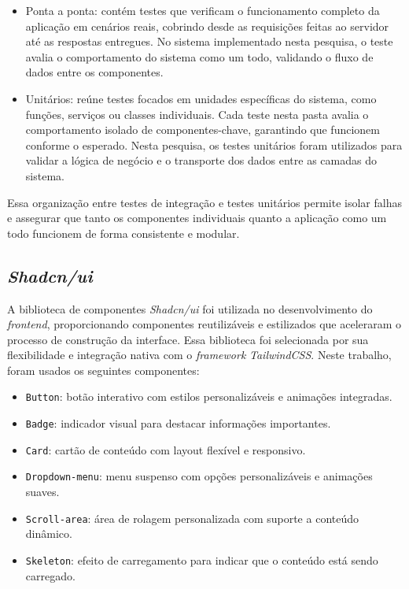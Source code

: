 \begin{itemize}
  \item Ponta a ponta: contém testes que verificam o funcionamento completo da aplicação em cenários reais, cobrindo desde as requisições feitas ao servidor até as respostas entregues. No sistema implementado nesta pesquisa, o teste avalia o comportamento do sistema como um todo, validando o fluxo de dados entre os componentes.
  \item Unitários: reúne testes focados em unidades específicas do sistema, como funções, serviços ou classes individuais. Cada teste nesta pasta avalia o comportamento isolado de componentes-chave, garantindo que funcionem conforme o esperado. Nesta pesquisa, os testes unitários foram utilizados para validar a lógica de negócio e o transporte dos dados entre as camadas do sistema.
\end{itemize}

Essa organização entre testes de integração e testes unitários permite isolar falhas e assegurar que tanto os componentes individuais quanto a aplicação como um todo funcionem de forma consistente e modular.

\subsection{\textit{Shadcn/ui}}
A biblioteca de componentes \textit{Shadcn/ui} foi utilizada no desenvolvimento do \textit{frontend}, proporcionando componentes reutilizáveis e estilizados que aceleraram o processo de construção da interface. Essa biblioteca foi selecionada por sua flexibilidade e integração nativa com o \textit{framework} \textit{TailwindCSS}. Neste trabalho, foram usados os seguintes componentes:
\begin{itemize}
  \item \texttt{Button}: botão interativo com estilos personalizáveis e animações integradas.
  \item \texttt{Badge}: indicador visual para destacar informações importantes.
  \item \texttt{Card}: cartão de conteúdo com layout flexível e responsivo.
  \item \texttt{Dropdown-menu}: menu suspenso com opções personalizáveis e animações suaves.
  \item \texttt{Scroll-area}: área de rolagem personalizada com suporte a conteúdo dinâmico.
  \item \texttt{Skeleton}: efeito de carregamento para indicar que o conteúdo está sendo carregado.
\end{itemize}

